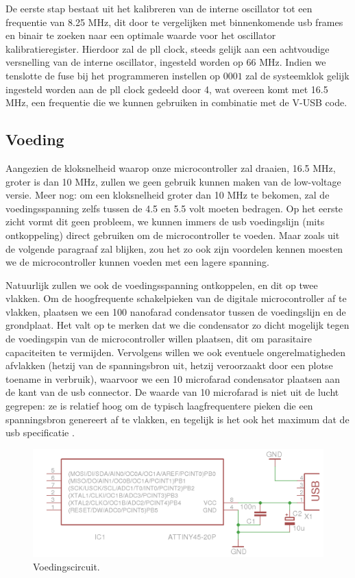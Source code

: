 De eerste stap bestaat uit het kalibreren van de interne oscillator tot een frequentie van 8.25 MHz, dit door te vergelijken met binnenkomende \ac{usb} frames en binair te zoeken naar een optimale waarde voor het  oscillator kalibratieregister. Hierdoor zal de \ac{pll} clock, steeds gelijk aan een achtvoudige versnelling van de interne oscillator, ingesteld worden op 66 MHz. Indien we tenslotte de  fuse bij het programmeren instellen op $0001$ zal de systeemklok gelijk ingesteld worden aan de \ac{pll} clock gedeeld door 4, wat overeen komt met 16.5 MHz, een frequentie die we kunnen gebruiken in combinatie met de V-USB code.

\subsection{Voeding}

Aangezien de kloksnelheid waarop onze microcontroller zal draaien, 16.5 MHz, groter is dan 10 MHz, zullen we geen gebruik kunnen maken van de low-voltage versie. Meer nog: om een kloksnelheid groter dan 10 MHz te bekomen, zal de voedingsspanning zelfs tussen de 4.5 en 5.5 volt moeten bedragen. Op het eerste zicht vormt dit geen probleem, we kunnen immers de \ac{usb} voedingslijn (mits ontkoppeling) direct gebruiken om de microcontroller te voeden. Maar zoals uit de volgende paragraaf zal blijken, zou het zo ook zijn voordelen kennen moesten we de microcontroller kunnen voeden met een lagere spanning.

Natuurlijk zullen we ook de voedingsspanning ontkoppelen, en dit op twee vlakken. Om de hoogfrequente schakelpieken van de digitale microcontroller af te vlakken, plaatsen we een 100 nanofarad condensator tussen de voedingslijn en de grondplaat. Het valt op te merken dat we die condensator zo dicht mogelijk tegen de voedingspin van de microcontroller willen plaatsen, dit om parasitaire capaciteiten te vermijden. Vervolgens willen we ook eventuele ongerelmatigheden afvlakken (hetzij van de spanningsbron uit, hetzij veroorzaakt door een plotse toename in verbruik), waarvoor we een 10 microfarad condensator plaatsen aan de kant van de \ac{usb} connector. De waarde van 10 microfarad is niet uit de lucht gegrepen: ze is relatief hoog om de typisch laagfrequentere pieken die een spanningsbron genereert af te vlakken, en tegelijk is het ook het maximum dat de \ac{usb} specificatie .

\begin{figure}
	\includegraphics[width=\textwidth]{afbeeldingen/inputmodule_voeding}
	\caption{Voedingscircuit.}
\end{figure}

